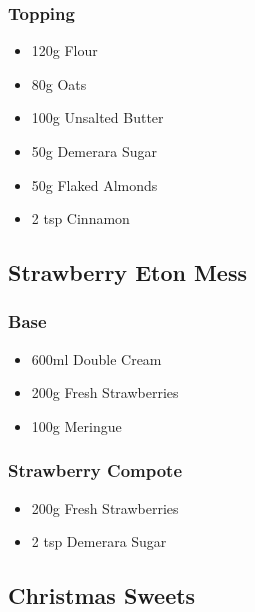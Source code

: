 \documentclass[11pt, english]{article}
\begin{document}
		\subsubsection*{Topping}

	\begin{itemize}
        \setlength\itemsep{0cm}
                \item 120g Flour
		\item 80g Oats
		\item 100g Unsalted Butter
		\item 50g Demerara Sugar
		\item 50g Flaked Almonds
		\item 2 tsp Cinnamon
        \end{itemize}

\newpage

	\subsection{Strawberry Eton Mess}

		\subsubsection*{Base}

	\begin{itemize}
        \setlength\itemsep{0cm}
                \item 600ml Double Cream
		\item 200g Fresh Strawberries
		\item 100g Meringue
        \end{itemize}

		\subsubsection*{Strawberry Compote}

	\begin{itemize}
        \setlength\itemsep{0cm}
                \item 200g Fresh Strawberries
		\item 2 tsp Demerara Sugar
        \end{itemize}

\newpage

	\subsection{Christmas Sweets}
\end{document}
